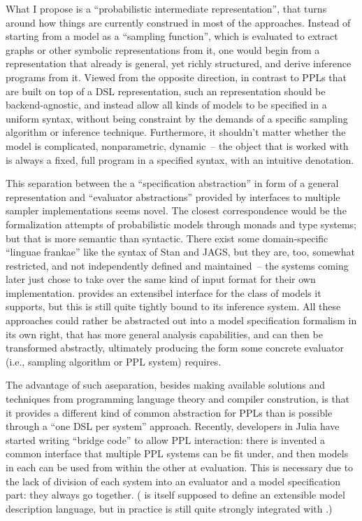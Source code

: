 What I propose is a \enquote{probabilistic intermediate representation}, that turns around how
things are currently construed in most of the approaches.  Instead of starting from a model as a
\enquote{sampling function}, which is evaluated to extract graphs or other symbolic representations
from it, one would begin from a representation that already is general, yet richly structured, and
derive inference programs from it.  Viewed from the opposite direction, in contrast to PPLs that are
built on top of a DSL representation, such an representation should be backend-agnostic, and instead
allow all kinds of models to be specified in a uniform syntax, without being constraint by the
demands of a specific sampling algorithm or inference technique.  Furthermore, it shouldn't matter
whether the model is complicated, nonparametric, dynamic~-- the object that is worked with is always
a fixed, full program in a specified syntax, with an intuitive denotation.

This separation between the a \enquote{specification abstraction} in form of a general
representation and \enquote{evaluator abstractions} provided by interfaces to multiple sampler
implementations seems novel.  The closest correspondence would be the formalization attempts of
probabilistic models through monads and type systems; but that is more semantic than syntactic.
There exist some domain-specific \enquote{linguae frankae} like the syntax of Stan and JAGS, but
they are, too, somewhat restricted, and not independently defined and maintained~-- the systems
coming later just chose to take over the same kind of input format for their own implementation.
 \parencite{cusumano-towner2020gen} provides an extensibel interface for the
class of models it supports, but this is still quite tightly bound to its inference system.  All
these approaches could rather be abstracted out into a model specification formalism in its own
right, that has more general analysis capabilities, and can then be transformed abstractly,
ultimately producing the form some concrete evaluator (i.e., sampling algorithm or PPL system)
requires.

The advantage of such aseparation, besides making available solutions and techniques from
programming language theory and compiler constrution, is that it provides a different kind of common
abstraction for PPLs than is possible through a \enquote{one DSL per system} approach.  Recently,
developers in Julia have started writing \enquote{bridge code} to allow PPL interaction: there is
invented a common interface that multiple PPL systems can be fit under, and then models in each can
be used from within the other at evaluation.  This is necessary due to the lack of division of each
system into an evaluator and a model specification part: they always go together.  (\dppljl{} is
itself supposed to define an extensible model description language, but in practice is still quite
strongly integrated with \turingjl{}.)

